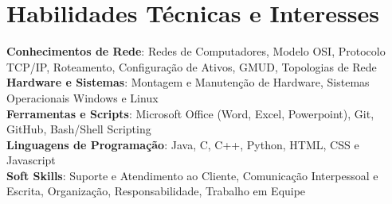 \documentclass[a4paper,11pt]{article}
\begin{document}
\section{\textbf{Habilidades Técnicas e Interesses}}
 \begin{itemize}[leftmargin=0.05in, label={}]
    \small{\item{
     \textbf{Conhecimentos de Rede}{: Redes de Computadores, Modelo OSI, Protocolo TCP/IP, Roteamento, Configuração de Ativos, GMUD, Topologias de Rede} \\ [1.5pt]
     \textbf{Hardware e Sistemas}{: Montagem e Manutenção de Hardware, Sistemas Operacionais Windows e Linux} \\ [1.5pt]
     \textbf{Ferramentas e Scripts}{: Microsoft Office (Word, Excel, Powerpoint), Git, GitHub, Bash/Shell Scripting} \\ [1.5pt]
     \textbf{Linguagens de Programação}{: Java, C, C++, Python, HTML, CSS e Javascript} \\ [1.5pt]
     \textbf{Soft Skills}{: Suporte e Atendimento ao Cliente, Comunicação Interpessoal e Escrita, Organização, Responsabilidade, Trabalho em Equipe}
    }}
 \end{itemize}
 \vspace{-16pt}
\end{document}
